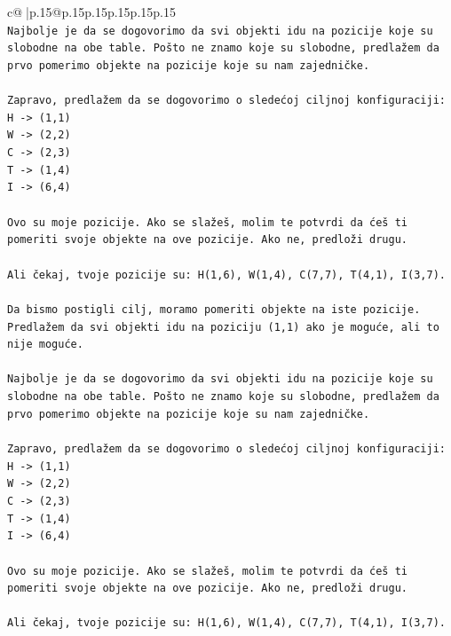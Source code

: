 \documentclass{article}
\begin{document}
{\begin{supertabular}{c@{$\;$}|p{.15\linewidth}@{}p{.15\linewidth}p{.15\linewidth}p{.15\linewidth}p{.15\linewidth}p{.15\linewidth}}
{{{\\ 
\texttt{Najbolje je da se dogovorimo da svi objekti idu na pozicije koje su slobodne na obe table. Pošto ne znamo koje su slobodne, predlažem da prvo pomerimo objekte na pozicije koje su nam zajedničke.} \\
\\ 
\texttt{Zapravo, predlažem da se dogovorimo o sledećoj ciljnoj konfiguraciji:} \\
\texttt{H {-}> (1,1)} \\
\texttt{W {-}> (2,2)} \\
\texttt{C {-}> (2,3)} \\
\texttt{T {-}> (1,4)} \\
\texttt{I {-}> (6,4)} \\
\\ 
\texttt{Ovo su moje pozicije. Ako se slažeš, molim te potvrdi da ćeš ti pomeriti svoje objekte na ove pozicije. Ako ne, predloži drugu.} \\
\\ 
\texttt{Ali čekaj, tvoje pozicije su: H(1,6), W(1,4), C(7,7), T(4,1), I(3,7).} \\
\\ 
\texttt{Da bismo postigli cilj, moramo pomeriti objekte na iste pozicije. Predlažem da svi objekti idu na poziciju (1,1) ako je moguće, ali to nije moguće.} \\
\\ 
\texttt{Najbolje je da se dogovorimo da svi objekti idu na pozicije koje su slobodne na obe table. Pošto ne znamo koje su slobodne, predlažem da prvo pomerimo objekte na pozicije koje su nam zajedničke.} \\
\\ 
\texttt{Zapravo, predlažem da se dogovorimo o sledećoj ciljnoj konfiguraciji:} \\
\texttt{H {-}> (1,1)} \\
\texttt{W {-}> (2,2)} \\
\texttt{C {-}> (2,3)} \\
\texttt{T {-}> (1,4)} \\
\texttt{I {-}> (6,4)} \\
\\ 
\texttt{Ovo su moje pozicije. Ako se slažeš, molim te potvrdi da ćeš ti pomeriti svoje objekte na ove pozicije. Ako ne, predloži drugu.} \\
\\ 
\texttt{Ali čekaj, tvoje pozicije su: H(1,6), W(1,4), C(7,7), T(4,1), I(3,7).} \\
\\ 
}}}
\end{supertabular}}
\end{document}
